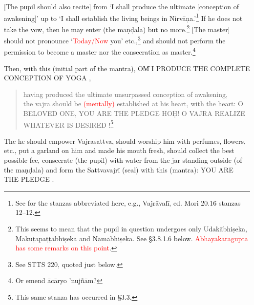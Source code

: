 \documentclass[11pt]{book}
\makeatletter
\def\fakesc#1{%
  \begingroup%
  \xdef\fake@name{\csname\curr@fontshape/\f@size\endcsname}%
  \fontsize{1.3\fontdimen8\fake@name}{\baselineskip}\selectfont%
  \uppercase{#1}%
  \endgroup%
}
\newcommand{\mantra}[1]{\fakesc{#1}}
\newcommand{\red}[1]{\textcolor{red}{#1}}
\makeatother
\begin{document}
[The pupil should also recite] from `I shall produce the ultimate [conception of awakening]' up to `I shall establish the living beings in Nirvāṇa.'\footnote{See for the stanzas abbreviated here, e.g., Vajrāvalī, ed. Mori 20.16 stanzas 12–12.}
If he does not take the vow, then he may enter (the maṇḍala) but no more.\footnote{This seems to mean that the pupil in question undergoes only Udakābhiṣeka, Makuṭapaṭṭābhiṣeka and Nāmābhiṣeka. See §3.8.1.6 below. \red{Abhayākaragupta has some remarks on this point}.} [The master] should not pronounce `\red{Today/Now} you' etc.,\footnote{See STTS 220, quoted just below.} and should not perform the permission to become a master nor the consecration as master.\footnote{Or emend ācāryo 'nujñām?}

Then, with this (initial part of the mantra), \mantra{om̐ I produce the complete conception of yoga},

\begin{verse}
having produced the ultimate unsurpassed conception of awakening,\\
the vajra should be \red{(mentally)}%
established at his heart, with the heart: \mantra{o beloved one, you are the pledge hoḥ! o vajra realize whatever is desired}!\footnote{This same stanza has occurred in §3.3.}
\end{verse}

The he should empower Vajrasattva, should worship him with perfumes, flowers, etc., put a garland on him and made his mouth fresh, should collect the best possible fee, consecrate (the pupil) with water from the jar standing outside (of the maṇḍala) and form the Sattvavajrī (seal) with this (mantra): \mantra{you are the pledge}.
\end{document}
